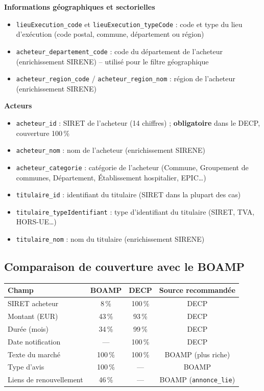 \documentclass[12pt,a4paper]{article}
\begin{document}
\medskip
\textbf{Informations géographiques et sectorielles}

\begin{itemize}
  \item[---] \texttt{lieuExecution\_code} et \texttt{lieuExecution\_typeCode} :
    code et type du lieu d'exécution (code postal, commune, département ou
    région)
  \item[---] \texttt{acheteur\_departement\_code} : code du département de
    l'acheteur (enrichissement SIRENE) -- utilisé pour le filtre géographique
  \item[---] \texttt{acheteur\_region\_code} / \texttt{acheteur\_region\_nom} :
    région de l'acheteur (enrichissement SIRENE)
\end{itemize}

\medskip
\textbf{Acteurs}

\begin{itemize}
  \item[---] \texttt{acheteur\_id} : SIRET de l'acheteur (14 chiffres) ;
    \textbf{obligatoire} dans le DECP, couverture 100\,\%
  \item[---] \texttt{acheteur\_nom} : nom de l'acheteur (enrichissement SIRENE)
  \item[---] \texttt{acheteur\_categorie} : catégorie de l'acheteur (Commune,
    Groupement de communes, Département, Établissement hospitalier, EPIC\ldots)
  \item[---] \texttt{titulaire\_id} : identifiant du titulaire (SIRET dans la
    plupart des cas)
  \item[---] \texttt{titulaire\_typeIdentifiant} : type d'identifiant du
    titulaire (SIRET, TVA, HORS-UE\ldots)
  \item[---] \texttt{titulaire\_nom} : nom du titulaire (enrichissement SIRENE)
\end{itemize}

\subsection{Comparaison de couverture avec le BOAMP}

\begin{center}
\begin{tabular}{lccc}
\toprule
\textbf{Champ} & \textbf{BOAMP} & \textbf{DECP} &
  \textbf{Source recommandée} \\
\midrule
SIRET acheteur    & 8\,\%   & 100\,\% & DECP \\
Montant (EUR)     & 43\,\%  & 93\,\%  & DECP \\
Durée (mois)      & 34\,\%  & 99\,\%  & DECP \\
Date notification & ---     & 100\,\% & DECP \\
Texte du marché   & 100\,\% & 100\,\% & BOAMP (plus riche) \\
Type d'avis       & 100\,\% & ---     & BOAMP \\
Liens de renouvellement & 46\,\% & ---  & BOAMP (\texttt{annonce\_lie}) \\
\bottomrule
\end{tabular}
\end{center}
\end{document}
